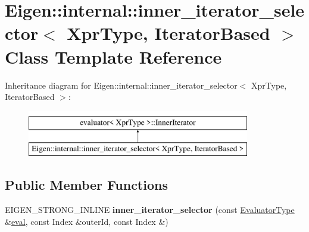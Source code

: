 \hypertarget{class_eigen_1_1internal_1_1inner__iterator__selector_3_01_xpr_type_00_01_iterator_based_01_4}{}\section{Eigen\+::internal\+::inner\+\_\+iterator\+\_\+selector$<$ Xpr\+Type, Iterator\+Based $>$ Class Template Reference}
\label{class_eigen_1_1internal_1_1inner__iterator__selector_3_01_xpr_type_00_01_iterator_based_01_4}
Inheritance diagram for Eigen\+::internal\+::inner\+\_\+iterator\+\_\+selector$<$ Xpr\+Type, Iterator\+Based $>$\+:\begin{figure}[H]
\begin{center}
\leavevmode
\includegraphics[height=2.000000cm]{class_eigen_1_1internal_1_1inner__iterator__selector_3_01_xpr_type_00_01_iterator_based_01_4}
\end{center}
\end{figure}
\subsection*{Public Member Functions}
\begin{DoxyCompactItemize}
\item 
\mbox{\label{class_eigen_1_1internal_1_1inner__iterator__selector_3_01_xpr_type_00_01_iterator_based_01_4_a1dfaba22f39c3560fb588d35f940a540}} 
E\+I\+G\+E\+N\+\_\+\+S\+T\+R\+O\+N\+G\+\_\+\+I\+N\+L\+I\+NE {\bfseries inner\+\_\+iterator\+\_\+selector} (const \mbox{\hyperlink{struct_eigen_1_1internal_1_1evaluator}{Evaluator\+Type}} \&\mbox{\hyperlink{struct_eigen_1_1internal_1_1eval}{eval}}, const Index \&outer\+Id, const Index \&)
\end{DoxyCompactItemize}
